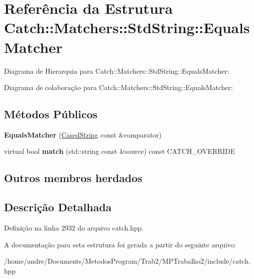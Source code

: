 \hypertarget{structCatch_1_1Matchers_1_1StdString_1_1EqualsMatcher}{}\section{Referência da Estrutura Catch\+:\+:Matchers\+:\+:Std\+String\+:\+:Equals\+Matcher}
\label{structCatch_1_1Matchers_1_1StdString_1_1EqualsMatcher}


Diagrama de Hierarquia para Catch\+:\+:Matchers\+:\+:Std\+String\+:\+:Equals\+Matcher\+:


Diagrama de colaboração para Catch\+:\+:Matchers\+:\+:Std\+String\+:\+:Equals\+Matcher\+:
\subsection*{Métodos Públicos}
\begin{DoxyCompactItemize}
\item 
{\bfseries Equals\+Matcher} (\hyperlink{structCatch_1_1Matchers_1_1StdString_1_1CasedString}{Cased\+String} const \&comparator)\hypertarget{structCatch_1_1Matchers_1_1StdString_1_1EqualsMatcher_ab740f1fb2310e9fe3fed5134d4c7e4c8}{}\label{structCatch_1_1Matchers_1_1StdString_1_1EqualsMatcher_ab740f1fb2310e9fe3fed5134d4c7e4c8}

\item 
virtual bool {\bfseries match} (std\+::string const \&source) const C\+A\+T\+C\+H\+\_\+\+O\+V\+E\+R\+R\+I\+DE\hypertarget{structCatch_1_1Matchers_1_1StdString_1_1EqualsMatcher_a2aeaac3c0efb8422643cd1b155256213}{}\label{structCatch_1_1Matchers_1_1StdString_1_1EqualsMatcher_a2aeaac3c0efb8422643cd1b155256213}

\end{DoxyCompactItemize}
\subsection*{Outros membros herdados}


\subsection{Descrição Detalhada}


Definição na linha 2932 do arquivo catch.\+hpp.



A documentação para esta estrutura foi gerada a partir do seguinte arquivo\+:\begin{DoxyCompactItemize}
\item 
/home/andre/\+Documents/\+Metodos\+Program/\+Trab2/\+M\+P\+Trabalho2/include/catch.\+hpp\end{DoxyCompactItemize}
